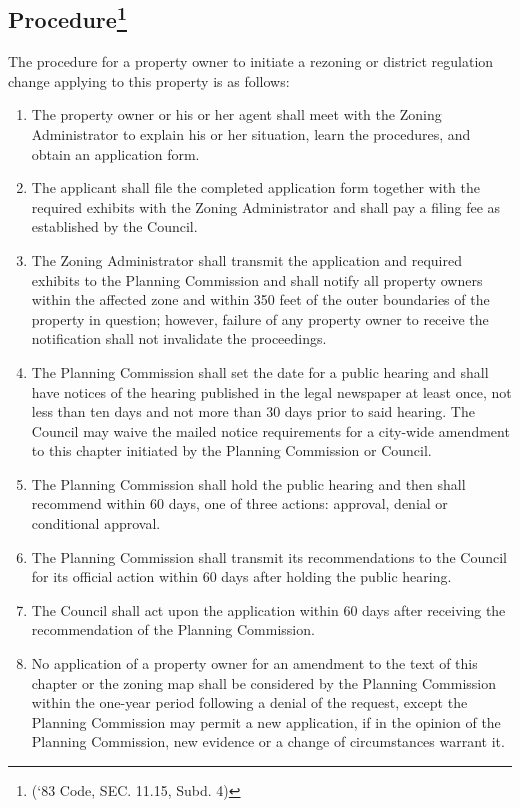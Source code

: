 \subsection{Procedure\footnote{(‘83 Code, SEC. 11.15, Subd. 4)}}
The procedure for a property owner to initiate a rezoning or district regulation change applying to this property is as follows:
\begin{enumerate}[{\indent}1)]
    \item The property owner or his or her agent shall meet with the Zoning Administrator to explain his or her situation, learn the procedures, and obtain an application form.
    \item The applicant shall file the completed application form together with the required exhibits with the Zoning Administrator and shall pay a filing fee as established by the Council.
    \item The Zoning Administrator shall transmit the application and required exhibits to the Planning Commission and shall notify all property owners within the affected zone and within 350 feet of the outer boundaries of the property in question; however, failure of any property owner to receive the notification shall not invalidate the proceedings.
    \item The Planning Commission shall set the date for a public hearing and shall have notices of the hearing published in the legal newspaper at least once, not less than ten days and not more than 30 days prior to said hearing. The Council may waive the mailed notice requirements for a city-wide amendment to this chapter initiated by the Planning Commission or Council.
    \item The Planning Commission shall hold the public hearing and then shall recommend within 60 days, one of three actions: approval, denial or conditional approval.
    \item The Planning Commission shall transmit its recommendations to the Council for its official action within 60 days after holding the public hearing.
    \item The Council shall act upon the application within 60 days after receiving the recommendation of the Planning Commission.
    \item No application of a property owner for an amendment to the text of this chapter or the zoning map shall be considered by the Planning Commission within the one-year period following a denial of the request, except the Planning Commission may permit a new application, if in the opinion of the Planning Commission, new evidence or a change of circumstances warrant it.
\end{enumerate}
